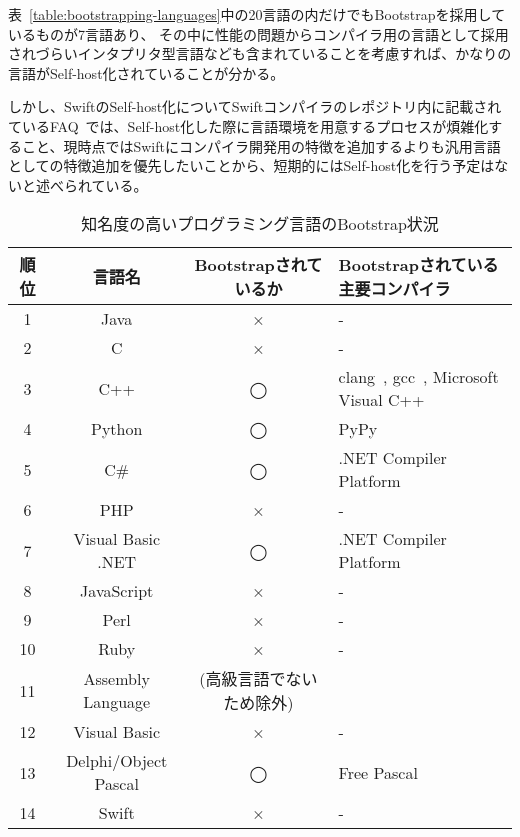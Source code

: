 表~\ref{table:bootstrapping-languages}中の20言語の内だけでもBootstrapを採用しているものが7言語あり、 その中に性能の問題からコンパイラ用の言語として採用されづらいインタプリタ型言語なども含まれていることを考慮すれば、かなりの言語がSelf-host化されていることが分かる。

しかし、SwiftのSelf-host化についてSwiftコンパイラのレポジトリ内に記載されているFAQ~\cite{swift-faq}では、Self-host化した際に言語環境を用意するプロセスが煩雑化すること、現時点ではSwiftにコンパイラ開発用の特徴を追加するよりも汎用言語としての特徴追加を優先したいことから、短期的にはSelf-host化を行う予定はないと述べられている。

\begin{table}[hb]
    \begin{center}
        \caption{知名度の高いプログラミング言語のBootstrap状況}
        \begin{tabular}{|c|c|c|m{4.5cm}|}
            \hline
            順位 & 言語名 & Bootstrapされているか & Bootstrapされている主要コンパイラ\\
            \hline
            1 & Java & × & -\\
            \hline
            2 & C & × & -\\
            \hline
            3 & C++ & ◯ & clang~\cite{clang}, gcc~\cite{gcc}, Microsoft Visual C++~\cite{vcpp}\\
            \hline
            4 & Python & ◯ & PyPy~\cite{pypy}\\
            \hline
            5 & C\# & ◯ & .NET Compiler Platform~\cite{roslyn}\\
            \hline
            6 & PHP & × & - \\
            \hline
            7 & Visual Basic .NET & ◯ & .NET Compiler Platform~\cite{roslyn}\\
            \hline
            8 & JavaScript & × & -\\
            \hline
            9 & Perl & × & -\\
            \hline
            10 & Ruby & × & -\\
            \hline
            11 & Assembly Language & (高級言語でないため除外) &\\
            \hline
            12 & Visual Basic & × & -\\
            \hline
            13 & Delphi/Object Pascal & ◯ & Free Pascal~\cite{free-pascal}\\
            \hline
            14 & Swift & × & -\\

\end{tabular}
\end{center}
\end{table}
